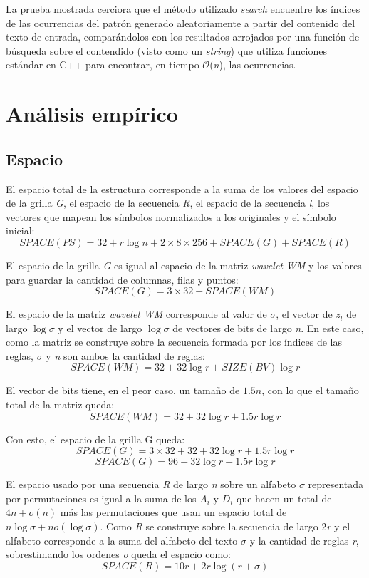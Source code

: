 La prueba mostrada cerciora que el método utilizado \textit{search} encuentre los índices de las ocurrencias del patrón generado aleatoriamente a partir del contenido del texto de entrada, comparándolos con los resultados arrojados por una función de búsqueda sobre el contendido (visto como un \textit{string}) que utiliza funciones estándar en C++ para encontrar, en tiempo $\mathcal{O}$(\textit{n}), las ocurrencias.

\section{Análisis empírico}
\subsection{Espacio}

El espacio total de la estructura corresponde a la suma de los valores del espacio de la grilla \textit{G}, el espacio de la secuencia \textit{R}, el espacio de la secuencia \textit{l}, los vectores que mapean los símbolos normalizados a los originales y el símbolo inicial:
\[
SPACE(PS) = 32 + r \log n + 2 \times 8 \times 256  + SPACE(G) + SPACE(R)
\]

El espacio de la grilla \textit{G} es igual al espacio de la matriz \textit{wavelet} \textit{WM} y los valores para guardar la cantidad de columnas, filas y puntos:
\[
SPACE(G) = 3 \times 32 + SPACE(WM)
\]

El espacio de la matriz \textit{wavelet} \textit{WM} corresponde al valor de $\sigma$, el vector de $z_l$ de largo $\log \sigma$ y el vector de largo $\log \sigma$ de vectores de bits de largo \textit{n}. En este caso, como la matriz se construye sobre la secuencia formada por los índices de las reglas, $\sigma$ y \textit{n} son ambos la cantidad de reglas:
\[
SPACE(WM) = 32 + 32 \log r + SIZE(BV) \log r 
\]

El vector de bits tiene, en el peor caso, un tamaño de $1.5n$, con lo que el tamaño total de la matriz queda:
\[
SPACE(WM) = 32 + 32 \log r +1.5 r \log r 
\]

Con esto, el espacio de la grilla G queda:
\[
SPACE(G) = 3 \times 32 + 32 + 32 \log r + 1.5 r \log r 
\]
\[
SPACE(G) = 96 + 32 \log r + 1.5 r \log r 
\]

El espacio usado por una secuencia \textit{R} de largo \textit{n} sobre un alfabeto $\sigma$ representada por permutaciones es igual a la suma de los $A_i$ y $D_i$ que hacen un total de $4n + o(n)$ más las permutaciones que usan un espacio total de $n \log \sigma + n o(\log \sigma)$. Como \textit{R} se construye sobre la secuencia de largo 2\textit{r} y el alfabeto corresponde a la suma del alfabeto del texto $\sigma$ y la cantidad de reglas \textit{r}, sobrestimando los ordenes \textit{o} queda el espacio como:
\[
SPACE(R) = 10r + 2 r \log {(r + \sigma)}
\]

